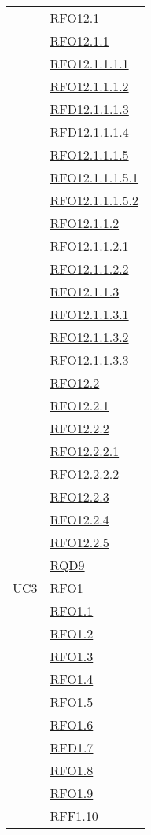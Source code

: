\begin{longtable}{|>{\centering}m{5cm}|m{5cm}<{\centering}|}
& \hyperlink{RFO12.1}{RFO12.1}\\
& \hyperlink{RFO12.1.1}{RFO12.1.1}\\
& \hyperlink{RFO12.1.1.1.1}{RFO12.1.1.1.1}\\
& \hyperlink{RFO12.1.1.1.2}{RFO12.1.1.1.2}\\
& \hyperlink{RFD12.1.1.1.3}{RFD12.1.1.1.3}\\
& \hyperlink{RFD12.1.1.1.4}{RFD12.1.1.1.4}\\
& \hyperlink{RFO12.1.1.1.5}{RFO12.1.1.1.5}\\
& \hyperlink{RFO12.1.1.1.5.1}{RFO12.1.1.1.5.1}\\
& \hyperlink{RFO12.1.1.1.5.2}{RFO12.1.1.1.5.2}\\
& \hyperlink{RFO12.1.1.2}{RFO12.1.1.2}\\
& \hyperlink{RFO12.1.1.2.1}{RFO12.1.1.2.1}\\
& \hyperlink{RFO12.1.1.2.2}{RFO12.1.1.2.2}\\
& \hyperlink{RFO12.1.1.3}{RFO12.1.1.3}\\
& \hyperlink{RFO12.1.1.3.1}{RFO12.1.1.3.1}\\
& \hyperlink{RFO12.1.1.3.2}{RFO12.1.1.3.2}\\
& \hyperlink{RFO12.1.1.3.3}{RFO12.1.1.3.3}\\

& \hyperlink{RFO12.2}{RFO12.2}\\
& \hyperlink{RFO12.2.1}{RFO12.2.1}\\
& \hyperlink{RFO12.2.2}{RFO12.2.2}\\
& \hyperlink{RFO12.2.2.1}{RFO12.2.2.1}\\
& \hyperlink{RFO12.2.2.2}{RFO12.2.2.2}\\
& \hyperlink{RFO12.2.3}{RFO12.2.3}\\
& \hyperlink{RFO12.2.4}{RFO12.2.4}\\
& \hyperlink{RFO12.2.5}{RFO12.2.5}\\
& \hyperlink{RQD9}{RQD9}\\

\hline
\hyperlink{UC3}{UC3} 
& \hyperlink{RFO1}{RFO1}\\
& \hyperlink{RFO1.1}{RFO1.1}\\
& \hyperlink{RFO1.2}{RFO1.2}\\
& \hyperlink{RFO1.3}{RFO1.3}\\
& \hyperlink{RFO1.4}{RFO1.4}\\
& \hyperlink{RFO1.5}{RFO1.5}\\
& \hyperlink{RFO1.6}{RFO1.6}\\
& \hyperlink{RFD1.7}{RFD1.7}\\
& \hyperlink{RFO1.8}{RFO1.8}\\
& \hyperlink{RFO1.9}{RFO1.9}\\
& \hyperlink{RFF1.10}{RFF1.10}\\\hline


\end{longtable}
